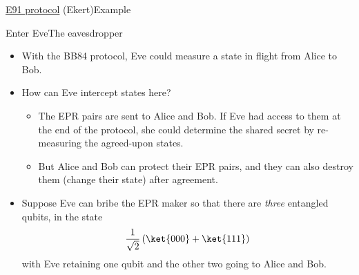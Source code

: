 {\begin{frame}{\href{https://en.wikipedia.org/wiki/Quantum_key_distribution\#E91_protocol:_Artur_Ekert_(1991)}{E91 protocol} (Ekert)}{Example}
\begin{EKey}
\end{EKey}

\end{frame}}

\begin{frame}{Enter Eve}{The eavesdropper}
\begin{itemize}[<+->]
    \item With the BB84 protocol, Eve could measure a state in flight from Alice to Bob.
    \item How can Eve intercept states here?
    \begin{itemize}
        \item The EPR pairs are sent to Alice and Bob.  If Eve had access to them at the end of the protocol, she could determine the shared secret by re-measuring the agreed-upon states.
        \item But Alice and Bob can protect their EPR pairs, and they can also destroy them (change their state) after agreement.
    \end{itemize}
    \item Suppose Eve can bribe the EPR maker so that there are \emph{three} entangled qubits, in the state
    \[ \RootTwo{}\left(\ket{000}+\ket{111}\right) \]
    with Eve retaining one qubit and the other two going to Alice and Bob.
\end{itemize}
\end{frame}


